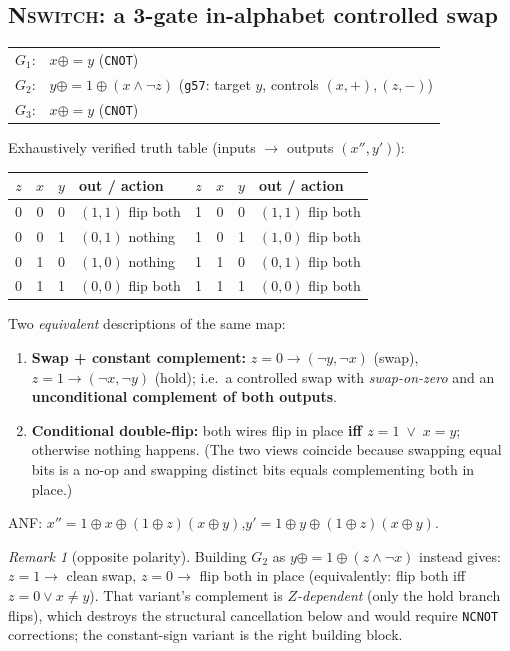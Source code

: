 \documentclass[11pt]{article}
\theoremstyle{remark}
\newtheorem*{remark}{Remark}
\newcommand{\g}{\texttt{g57}}
\newcommand{\CNOT}{\texttt{CNOT}}
\newcommand{\NCNOT}{\texttt{NCNOT}}
\newcommand{\NSW}{\textsc{Nswitch}}
\begin{document}
\subsection{\NSW: a 3-gate in-alphabet controlled swap}

\begin{center}
\begin{tabular}{ll}
$G_1$: & $x \mathrel{\oplus{=}} y$ \hfill (\CNOT)\\
$G_2$: & $y \mathrel{\oplus{=}} 1\oplus(x\wedge\neg z)$ \hfill (\g: target $y$, controls $(x,+),(z,-)$)\\
$G_3$: & $x \mathrel{\oplus{=}} y$ \hfill (\CNOT)
\end{tabular}
\end{center}

Exhaustively verified truth table (inputs $\to$ outputs $(x'',y')$):

\begin{center}
\begin{tabular}{cccl@{\qquad}cccl}
\toprule
$z$&$x$&$y$&out / action & $z$&$x$&$y$&out / action\\
\midrule
0&0&0&$(1,1)$ flip both & 1&0&0&$(1,1)$ flip both\\
0&0&1&$(0,1)$ nothing   & 1&0&1&$(1,0)$ flip both\\
0&1&0&$(1,0)$ nothing   & 1&1&0&$(0,1)$ flip both\\
0&1&1&$(0,0)$ flip both & 1&1&1&$(0,0)$ flip both\\
\bottomrule
\end{tabular}
\end{center}

Two \emph{equivalent} descriptions of the same map:
\begin{enumerate}
\item \textbf{Swap + constant complement:} $z=0\to(\neg y,\neg x)$ (swap), $z=1\to(\neg x,\neg y)$
(hold); i.e.\ a controlled swap with \emph{swap-on-zero} and an \textbf{unconditional complement
of both outputs}.
\item \textbf{Conditional double-flip:} both wires flip in place \textbf{iff $z=1\;\vee\;x=y$};
otherwise nothing happens. (The two views coincide because swapping equal bits is a no-op and
swapping distinct bits equals complementing both in place.)
\end{enumerate}
ANF: $x''=1\oplus x\oplus(1\oplus z)(x\oplus y)$,\quad $y'=1\oplus y\oplus(1\oplus z)(x\oplus y)$.

\begin{remark}[opposite polarity]
Building $G_2$ as $y\mathrel{\oplus{=}}1\oplus(z\wedge\neg x)$ instead gives: $z=1\to$ clean
swap, $z=0\to$ flip both in place (equivalently: flip both iff $z=0\vee x\neq y$). That
variant's complement is \emph{$Z$-dependent} (only the hold branch flips), which destroys the
structural cancellation below and would require \NCNOT{} corrections; the constant-sign variant
is the right building block.
\end{remark}
\end{document}
